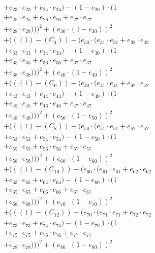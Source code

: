 \documentclass[10pt, a4paper]{article}
\begin{document}
\begin{small}
\begin{align*}
& + e_{23} \cdot e_{23} + e_{24} \cdot e_{24}) - (1 - e_{20}) \cdot (1 \\
& + e_{25} \cdot e_{25} + e_{26} \cdot e_{26} + e_{27} \cdot e_{27} \\
& + e_{28} \cdot e_{28})))^{2} + (e_{30} \cdot (1 - e_{30}))^{2} \\
& + (((1) - (C_{4})) - (e_{30} \cdot (e_{31} \cdot e_{31} + e_{32} \cdot e_{32} \\
& + e_{33} \cdot e_{33} + e_{34} \cdot e_{34}) - (1 - e_{30}) \cdot (1 \\
& + e_{35} \cdot e_{35} + e_{36} \cdot e_{36} + e_{37} \cdot e_{37} \\
& + e_{38} \cdot e_{38})))^{2} + (e_{40} \cdot (1 - e_{40}))^{2} \\
& + (((1) - (C_{6})) - (e_{40} \cdot (e_{41} \cdot e_{41} + e_{42} \cdot e_{42} \\
& + e_{43} \cdot e_{43} + e_{44} \cdot e_{44}) - (1 - e_{40}) \cdot (1 \\
& + e_{45} \cdot e_{45} + e_{46} \cdot e_{46} + e_{47} \cdot e_{47} \\
& + e_{48} \cdot e_{48})))^{2} + (e_{50} \cdot (1 - e_{50}))^{2} \\
& + (((1) - (C_{8})) - (e_{50} \cdot (e_{51} \cdot e_{51} + e_{52} \cdot e_{52} \\
& + e_{53} \cdot e_{53} + e_{54} \cdot e_{54}) - (1 - e_{50}) \cdot (1 \\
& + e_{55} \cdot e_{55} + e_{56} \cdot e_{56} + e_{57} \cdot e_{57} \\
& + e_{58} \cdot e_{58})))^{2} + (e_{60} \cdot (1 - e_{60}))^{2} \\
& + (((1) - (C_{10})) - (e_{60} \cdot (e_{61} \cdot e_{61} + e_{62} \cdot e_{62} \\
& + e_{63} \cdot e_{63} + e_{64} \cdot e_{64}) - (1 - e_{60}) \cdot (1 \\
& + e_{65} \cdot e_{65} + e_{66} \cdot e_{66} + e_{67} \cdot e_{67} \\
& + e_{68} \cdot e_{68})))^{2} + (e_{70} \cdot (1 - e_{70}))^{2} \\
& + (((1) - (C_{12})) - (e_{70} \cdot (e_{71} \cdot e_{71} + e_{72} \cdot e_{72} \\
& + e_{73} \cdot e_{73} + e_{74} \cdot e_{74}) - (1 - e_{70}) \cdot (1 \\
& + e_{75} \cdot e_{75} + e_{76} \cdot e_{76} + e_{77} \cdot e_{77} \\
& + e_{78} \cdot e_{78})))^{2} + (e_{80} \cdot (1 - e_{80}))^{2} \\

\end{align*}
\end{small}
\end{document}
